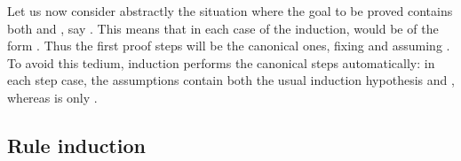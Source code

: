 \begin{isabellebody}
\begin{isamarkuptext}
Let us now consider abstractly the situation where the goal to be proved
contains both  and , say .
This means that in each case of the induction,
 would be of the form .  Thus the
first proof steps will be the canonical ones, fixing  and assuming
. To avoid this tedium, induction performs the canonical steps
automatically: in each step case, the assumptions contain both the
usual induction hypothesis and , whereas  is only
.

\subsection{Rule induction}


\end{isamarkuptext}
\end{isabellebody}
